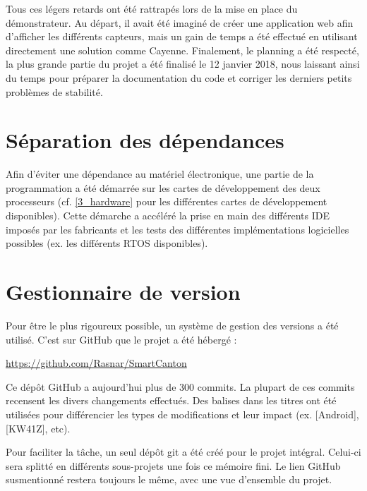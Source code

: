 Tous ces légers retards ont été rattrapés lors de la mise en place du démonstrateur. Au départ, il avait été imaginé de créer une application web afin d'afficher les différents capteurs, mais un gain de temps a été effectué en utilisant directement une solution comme Cayenne. Finalement, le planning a été respecté, la plus grande partie du projet a été finalisé le 12 janvier 2018, nous laissant ainsi du temps pour préparer la documentation du code et corriger les derniers petits problèmes de stabilité. 


\section{Séparation des dépendances}

Afin d'éviter une dépendance au matériel électronique, une partie de la programmation a été démarrée sur les cartes de développement des deux processeurs (cf. \cref{3_hardware} pour les différentes cartes de développement disponibles). Cette démarche a accéléré la prise en main des différents IDE imposés par les fabricants et les tests des différentes implémentations logicielles possibles (ex. les différents RTOS disponibles).

\section{Gestionnaire de version}

Pour être le plus rigoureux possible, un système de gestion des versions a été utilisé. C'est sur GitHub que le projet a été hébergé : 

\begin{center}
    \url{https://github.com/Rasnar/SmartCanton}
\end{center}

Ce dépôt GitHub a aujourd'hui plus de 300 commits. La plupart de ces commits recensent les divers changements effectués. Des balises dans les titres ont été utilisées pour différencier les types de modifications et leur impact (ex. [Android], [KW41Z], etc).

Pour faciliter la tâche, un seul dépôt git a été créé pour le projet intégral. Celui-ci sera splitté en différents sous-projets une fois ce mémoire fini. Le lien GitHub susmentionné restera toujours le même, avec une vue d'ensemble du projet.

